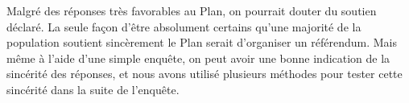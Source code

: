 \documentclass[a5paper,french,openany]{memoir}
\begin{document}
Malgré des réponses très favorables au Plan, on pourrait douter du soutien déclaré. 
La seule façon d'être absolument certains qu'une majorité de la population soutient sincèrement le Plan serait d'organiser un référendum. Mais même à l'aide d'une simple enquête, on peut avoir une bonne indication de la sincérité des réponses, et nous avons utilisé plusieurs méthodes pour tester cette sincérité dans la suite de l'enquête.
\end{document}
